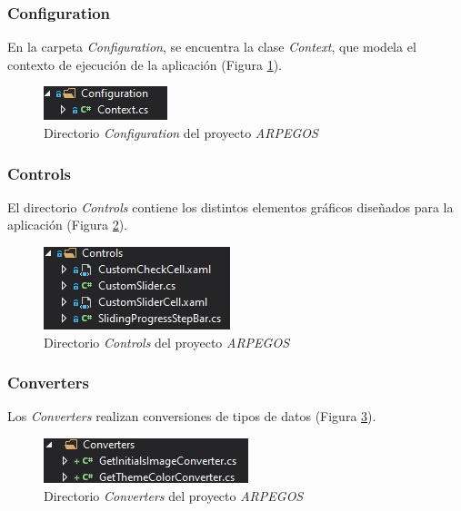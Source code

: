 {\subsubsection{Configuration}
En la carpeta \textit{Configuration}, se encuentra la clase \textit{Context}, que modela 
el contexto de ejecución de la aplicación (Figura \ref*{Configuration}).

\begin{figure}[H]
    \centering
    \includegraphics[scale=1.5]{Images/ARPEGOS_Configuration.jpg}
    \caption{Directorio \textit{Configuration} del proyecto \textit{ARPEGOS}}
    \label{Configuration}    
\end{figure}

\subsubsection{Controls}
El directorio \textit{Controls} contiene los distintos elementos gráficos diseñados para la aplicación (Figura \ref*{Controls}).

\begin{figure}[H]
    \centering
    \includegraphics[scale=1.5]{Images/ARPEGOS_Controls.jpg}
    \caption{Directorio \textit{Controls} del proyecto \textit{ARPEGOS}}
    \label{Controls}    
\end{figure}

\subsubsection{Converters}
Los \textit{Converters} realizan conversiones de tipos de datos (Figura \ref*{Converters}).

\begin{figure}[H]
    \centering
    \includegraphics[scale=1.5]{Images/ARPEGOS_Converters.jpg}
    \caption{Directorio \textit{Converters} del proyecto \textit{ARPEGOS}}
    \label{Converters}    
\end{figure}
\newpage
}
